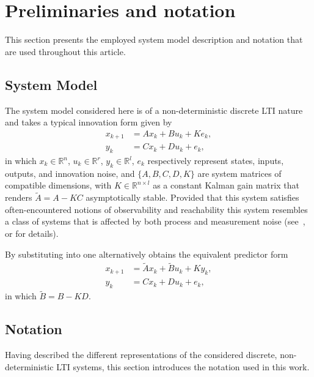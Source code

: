 \section{Preliminaries and notation}
This section presents the employed system model description and notation that are used throughout this article.

\subsection{System Model}
The system model considered here is of a non-deterministic discrete \ac{LTI} nature and takes a typical innovation form given by
\begin{subequations}\label{eqn:SS_innovation}
\begin{align}
	x_{k+1} &= Ax_k + Bu_k + Ke_k,\label{eqn:SSi_x}\\
	y_k &= Cx_k + Du_k + e_k \label{eqn:SSi_y},
\end{align}
\end{subequations}
in which ${x_k\in\mathbb{R}^n}$, ${u_k\in\mathbb{R}^r}$, ${y_k\in\mathbb{R}^l}$, $e_k$ respectively represent states, inputs, outputs, and innovation noise, and $\{A,B,C,D,K\}$ are system matrices of compatible dimensions, with $K\in\mathbb{R}^{n\times l}$ as a constant Kalman gain matrix that renders ${\tilde{A}=A-KC}$ asymptotically stable. Provided that this system satisfies often-encountered notions of observability and reachability this system resembles a class of systems that is affected by both process and measurement noise (see~\cite[p.~112-113]{Anderson1979}, or \cite[p.~162]{Verhaegen2007a} for details).

By substituting  into  one alternatively obtains the equivalent predictor form
\begin{subequations}\label{eqn:SS_predictor}
\begin{align}
	x_{k+1} &= \tilde{A}x_k + \tilde{B}u_k + Ky_k,\label{eqn:SSp_x}\\
	y_k &= Cx_k + Du_k + e_k \label{eqn:SSp_y},
\end{align}
\end{subequations}
in which $\tilde{B}=B-KD$.

\subsection{Notation}
Having described the different representations of the considered discrete, non-deterministic \ac{LTI} systems, this section introduces the notation used in this work.

